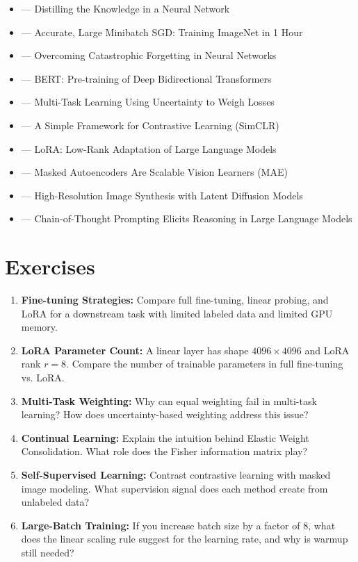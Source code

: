 \begin{itemize}
    \item \cite{hinton2015distilling} --- Distilling the Knowledge in a Neural Network
    \item \cite{goyal2017accurate} --- Accurate, Large Minibatch SGD: Training ImageNet in 1 Hour
    \item \cite{kirkpatrick2017overcoming} --- Overcoming Catastrophic Forgetting in Neural Networks
    \item \cite{devlin2018bert} --- BERT: Pre-training of Deep Bidirectional Transformers
    \item \cite{kendall2018multi} --- Multi-Task Learning Using Uncertainty to Weigh Losses
    \item \cite{chen2020simple} --- A Simple Framework for Contrastive Learning (SimCLR)
    \item \cite{hu2021lora} --- LoRA: Low-Rank Adaptation of Large Language Models
    \item \cite{he2022masked} --- Masked Autoencoders Are Scalable Vision Learners (MAE)
    \item \cite{rombach2022high} --- High-Resolution Image Synthesis with Latent Diffusion Models
    \item \cite{wei2022regard} --- Chain-of-Thought Prompting Elicits Reasoning in Large Language Models
\end{itemize}

\section{Exercises}

\begin{enumerate}
    \item \textbf{Fine-tuning Strategies:} Compare full fine-tuning, linear probing, and LoRA for a downstream task with limited labeled data and limited GPU memory.

    \item \textbf{LoRA Parameter Count:} A linear layer has shape $4096 \times 4096$ and LoRA rank $r=8$. Compare the number of trainable parameters in full fine-tuning vs. LoRA.

    \item \textbf{Multi-Task Weighting:} Why can equal weighting fail in multi-task learning? How does uncertainty-based weighting address this issue?

    \item \textbf{Continual Learning:} Explain the intuition behind Elastic Weight Consolidation. What role does the Fisher information matrix play?

    \item \textbf{Self-Supervised Learning:} Contrast contrastive learning with masked image modeling. What supervision signal does each method create from unlabeled data?

    \item \textbf{Large-Batch Training:} If you increase batch size by a factor of 8, what does the linear scaling rule suggest for the learning rate, and why is warmup still needed?
\end{enumerate}


